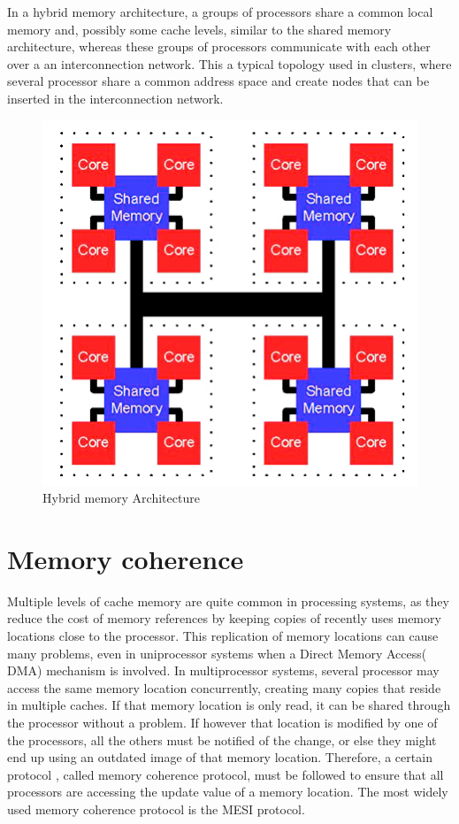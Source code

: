 In a hybrid memory architecture, a groups of processors share a common local memory and, possibly some cache levels, similar to the shared memory architecture, whereas these groups of processors communicate with each other over a  an interconnection network. This a typical topology used in clusters, where several processor share a common address space and create nodes that can be inserted in the interconnection network.

\begin{figure}
 \centering
  \includegraphics[scale=1.5]{hybrid_memory.jpg}
\caption{Hybrid memory Architecture}
\label{Hybrid memory architecture}
\end{figure}

\section{Memory coherence}

Multiple levels of cache memory are quite common in processing systems, as they reduce the cost of memory references by keeping copies of recently uses memory locations close to the processor. This replication of memory locations can cause many problems, even in uniprocessor systems when a Direct Memory Access( DMA) mechanism is involved. In multiprocessor systems, several processor may access the same memory location concurrently, creating many copies that reside in multiple caches. If that memory location is only read, it can be shared through the processor without a problem. If however that location is modified by one of the processors, all the others must be notified of the change, or else they might end up using an outdated image of that memory location. Therefore, a certain protocol , called memory coherence protocol, must be followed to ensure that all processors are accessing the update value of a memory location. The most widely used memory coherence protocol is the MESI protocol.

